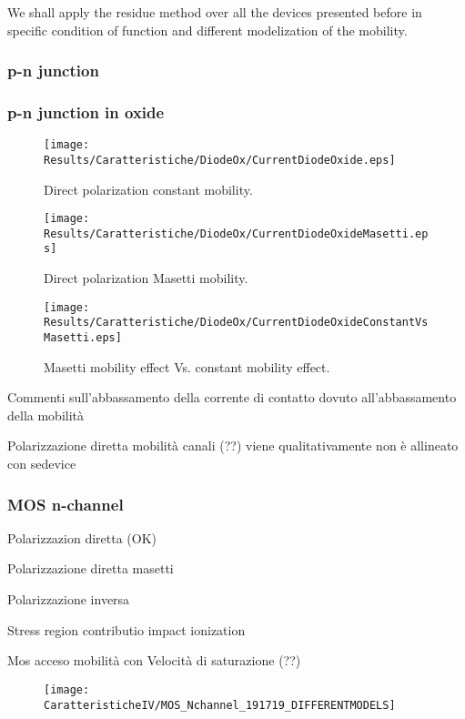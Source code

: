 We shall apply the residue method over all the devices presented before in specific condition of function and different modelization of the mobility.

\subsubsection{p-n junction}



\clearpage



\subsubsection{p-n junction in oxide}

\begin{figure}[!h]
\centering
\texttt{[image: Results/Caratteristiche/DiodeOx/CurrentDiodeOxide.eps]}
\caption{Direct polarization constant mobility.}
\end{figure}



\begin{figure}[!h]
\centering
\texttt{[image: Results/Caratteristiche/DiodeOx/CurrentDiodeOxideMasetti.eps]}
\caption{Direct polarization Masetti mobility.}
\end{figure}

\begin{figure}[!h]
\centering
\texttt{[image: Results/Caratteristiche/DiodeOx/CurrentDiodeOxideConstantVsMasetti.eps]}
\caption{Masetti mobility effect Vs. constant mobility effect.}
\end{figure}

Commenti sull'abbassamento della corrente di contatto dovuto all'abbassamento della mobilità

Polarizzazione diretta mobilità canali (??) viene qualitativamente non \`e allineato con sedevice



\clearpage

\subsubsection{MOS n-channel}

Polarizzazion diretta (OK)

Polarizzazione diretta masetti 

Polarizzazione inversa

Stress region contributio impact ionization

Mos acceso mobilità con Velocità di saturazione (??)

\begin{figure}[!h]
\texttt{[image: CaratteristicheIV/MOS\_Nchannel\_191719\_DIFFERENTMODELS]}
\end{figure}
